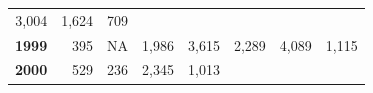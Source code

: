 \documentclass[]{article}
\begin{document}
\begin{longtable}[]{@{}rrrrrrrr@{}}
\begin{minipage}[t]{0.09\columnwidth}
3,004\strut
\end{minipage} & \begin{minipage}[t]{0.08\columnwidth}\raggedleft\strut
1,624\strut
\end{minipage} & \begin{minipage}[t]{0.10\columnwidth}\raggedleft\strut
709\strut
\end{minipage}\tabularnewline
\begin{minipage}[t]{0.08\columnwidth}\raggedleft\strut
\textbf{1999}\strut
\end{minipage} & \begin{minipage}[t]{0.10\columnwidth}\raggedleft\strut
395\strut
\end{minipage} & \begin{minipage}[t]{0.11\columnwidth}\raggedleft\strut
NA\strut
\end{minipage} & \begin{minipage}[t]{0.08\columnwidth}\raggedleft\strut
1,986\strut
\end{minipage} & \begin{minipage}[t]{0.14\columnwidth}\raggedleft\strut
3,615\strut
\end{minipage} & \begin{minipage}[t]{0.09\columnwidth}\raggedleft\strut
2,289\strut
\end{minipage} & \begin{minipage}[t]{0.08\columnwidth}\raggedleft\strut
4,089\strut
\end{minipage} & \begin{minipage}[t]{0.10\columnwidth}\raggedleft\strut
1,115\strut
\end{minipage}\tabularnewline
\begin{minipage}[t]{0.08\columnwidth}\raggedleft\strut
\textbf{2000}\strut
\end{minipage} & \begin{minipage}[t]{0.10\columnwidth}\raggedleft\strut
529\strut
\end{minipage} & \begin{minipage}[t]{0.11\columnwidth}\raggedleft\strut
236\strut
\end{minipage} & \begin{minipage}[t]{0.08\columnwidth}\raggedleft\strut
2,345\strut
\end{minipage} & \begin{minipage}[t]{0.14\columnwidth}\raggedleft\strut
1,013\strut
\end{minipage} & \begin{minipage}[t]{0.09\columnwidth}\raggedleft\strut

\end{minipage}
\end{longtable}
\end{document}
